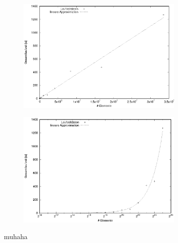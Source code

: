     \begin{figure}[t]%
      \centering
      \begin{subfigure}{\textwidth}
	\includegraphics[width=0.9\textwidth]{img/grav_1_x_lin.eps}
	\subcaption{ }
      \end{subfigure}
      \begin{subfigure}{\textwidth}
	\includegraphics[width=0.9\textwidth]{img/grav_1_x_log.eps}
	\subcaption{ }
      \end{subfigure}
      \caption{muhaha}
    \end{figure}%
    